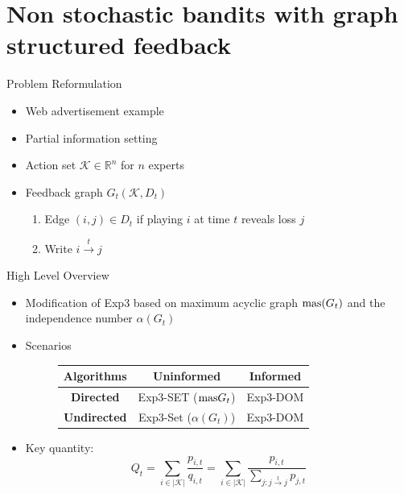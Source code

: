 \documentclass{beamer}
\newcommand{\mas}{\text{\normalfont mas}}
\begin{document}
\section{Non stochastic bandits with graph structured feedback}
\begin{frame}{Problem Reformulation}
  \begin{itemize}
    \item Web advertisement example

    \item Partial information setting

    \item Action set $\mathcal{K}\in \mathbb{R}^n$ for $n$ experts
    \item Feedback graph $G_t(\mathcal{K}, D_t)$ 
    \begin{enumerate}
      \item Edge $(i,j)\in D_t$ if playing $i$ at time $t$ reveals loss $j$
      \item Write $i\overset{t}{\to}j$
    \end{enumerate}
  \end{itemize}
\end{frame}

\begin{frame}{High Level Overview}
  \begin{itemize}
    \item Modification of Exp3 based on maximum acyclic graph $\mas(G_t)$ and the independence number $\alpha(G_t)$
    \item Scenarios
      \begin{figure}[]
      \center
      \begin{tabular}{ | c | c | c | }
          \hline
          \textbf{Algorithms} & \textbf{Uninformed} & \textbf{Informed} \\
          \hline
          \textbf{Directed} & Exp3-SET ($\mas{G_t}$) & Exp3-DOM\\
          \hline
          \textbf{Undirected} & Exp3-Set ($\alpha(G_t)$) & Exp3-DOM\\
          \hline
      \end{tabular}
      \end{figure}

    \item Key quantity: $$Q_t=\sum_{i\in |\mathcal{K}|}\frac{p_{i,t}}{q_{i,t}} = \sum_{i\in |\mathcal{K}|}\frac{p_{i,t}}{\sum_{j:j\overset{t}{\to}j} p_{j,t}}$$
  \end{itemize}
\end{frame} 
\end{document}

